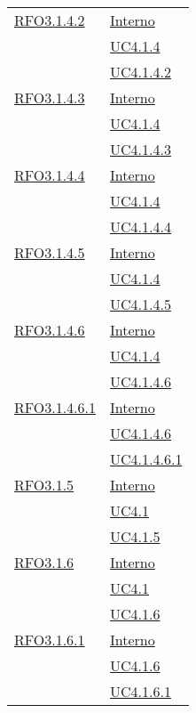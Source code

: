 \begin{longtable}{|>{\centering}m{5cm}|m{5cm}<{\centering}|}
\hyperlink{RFO3.1.4.2}{RFO3.1.4.2} & \hyperlink{Interno}{Interno}\\
& \hyperref[UC4.1.4]{UC4.1.4}\\
& \hyperref[UC4.1.4.2]{UC4.1.4.2}\\ \hline

\hyperlink{RFO3.1.4.3}{RFO3.1.4.3} & \hyperlink{Interno}{Interno}\\
& \hyperref[UC4.1.4]{UC4.1.4}\\
& \hyperref[UC4.1.4.3]{UC4.1.4.3}\\ \hline

\hyperlink{RFO3.1.4.4}{RFO3.1.4.4} & \hyperlink{Interno}{Interno}\\
& \hyperref[UC4.1.4]{UC4.1.4}\\
& \hyperref[UC4.1.4.4]{UC4.1.4.4}\\ \hline

\hyperlink{RFO3.1.4.5}{RFO3.1.4.5} & \hyperlink{Interno}{Interno}\\
& \hyperref[UC4.1.4]{UC4.1.4}\\
& \hyperref[UC4.1.4.5]{UC4.1.4.5}\\ \hline

\hyperlink{RFO3.1.4.6}{RFO3.1.4.6} & \hyperlink{Interno}{Interno}\\
& \hyperref[UC4.1.4]{UC4.1.4}\\
& \hyperref[UC4.1.4.6]{UC4.1.4.6}\\ \hline

\hyperlink{RFO3.1.4.6.1}{RFO3.1.4.6.1} & \hyperlink{Interno}{Interno}\\
& \hyperref[UC4.1.4.6]{UC4.1.4.6}\\
& \hyperref[UC4.1.4.6.1]{UC4.1.4.6.1}\\ \hline

\hyperlink{RFO3.1.5}{RFO3.1.5} & \hyperlink{Interno}{Interno}\\
& \hyperref[UC4.1]{UC4.1}\\
& \hyperref[UC4.1.5]{UC4.1.5}\\ \hline

\hyperlink{RFO3.1.6}{RFO3.1.6} & \hyperlink{Interno}{Interno}\\
& \hyperref[UC4.1]{UC4.1}\\
& \hyperref[UC4.1.6]{UC4.1.6}\\ \hline

\hyperlink{RFO3.1.6.1}{RFO3.1.6.1} & \hyperlink{Interno}{Interno}\\
& \hyperref[UC4.1.6]{UC4.1.6}\\
& \hyperref[UC4.1.6.1]{UC4.1.6.1}\\ \hline


\end{longtable}
